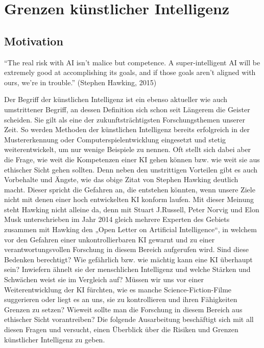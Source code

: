 
\chapter{Grenzen künstlicher Intelligenz}
\section{Motivation}
“The real risk with AI isn’t malice but competence.
A super-intelligent AI will be extremely good at accomplishing its goals, and if those goals aren’t aligned with ours, we’re in trouble.” (Stephen Hawking, 2015)

Der Begriff der künstlichen Intelligenz ist ein ebenso aktueller wie auch umstrittener Begriff, an dessen Definition sich schon seit Längerem die Geister scheiden.
Sie gilt als eine der zukunftsträchtigsten Forschungsthemen unserer Zeit.
So werden Methoden der künstlichen Intelligenz bereits erfolgreich in der Mustererkennung oder Computerspielentwicklung eingesetzt und stetig weiterentwickelt, um nur wenige Beispiele zu nennen.
Oft stellt sich dabei aber die Frage, wie weit die Kompetenzen einer KI gehen können bzw.
wie weit sie aus ethischer Sicht gehen sollten.
Denn neben den unstrittigen Vorteilen gibt es auch Vorbehalte und Ängste, wie das obige Zitat von Stephen Hawking deutlich macht.
Dieser spricht die Gefahren an, die entstehen könnten, wenn unsere Ziele nicht mit denen einer hoch entwickelten KI konform laufen.
Mit dieser Meinung steht Hawking nicht alleine da, denn mit Stuart J.Russell, Peter Norvig und Elon Musk unterschrieben im Jahr 2014 gleich mehrere Experten des Gebiets zusammen mit Hawking den „Open Letter on Artificial Intelligence“, in welchem vor den Gefahren einer unkontrollierbaren KI gewarnt und zu einer verantwortungsvollen Forschung in diesem Bereich aufgerufen wird.
Sind diese Bedenken berechtigt? Wie gefährlich bzw.
wie mächtig kann eine KI überhaupt sein? Inwiefern ähnelt sie der menschlichen Intelligenz und welche Stärken und Schwächen weist sie im Vergleich auf? Müssen wir uns vor einer Weiterentwicklung der KI fürchten, wie es manche Science-Fiction-Filme suggerieren oder liegt es an uns, sie zu kontrollieren und ihren Fähigkeiten Grenzen zu setzen?
Wieweit sollte man die Forschung in diesem Bereich aus ethischer Sicht vorantreiben?
Die folgende Ausarbeitung beschäftigt sich mit all diesen Fragen und versucht, einen Überblick über die Risiken und Grenzen künstlicher Intelligenz zu geben.

